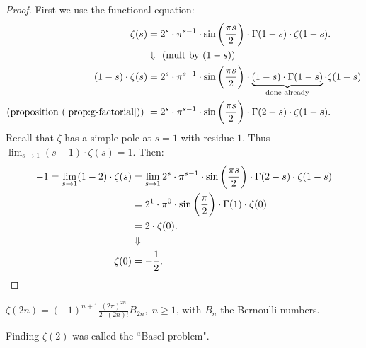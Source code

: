 \begin{proof}
First we use the functional equation:
\begin{align*}
    \zeta(s) &= 2^s \cdot \pi^{s-1} \cdot \sin\left( \frac{\pi s}{2} \right) \cdot \Gamma(1-s) \cdot \zeta(1-s).\\
    &\Downarrow \text{ (mult by $(1-s)$)}\\
    (1-s)\cdot \zeta(s) &= 2^s \cdot \pi^{s-1} \cdot \sin\left( \frac{\pi s}{2} \right) \cdot \underbrace{(1-s)\cdot \Gamma(1-s)}_{\text{done already}} \cdot \zeta(1-s)\\
    \text{(proposition (\ref{prop:g-factorial})) } &= 2^s \cdot \pi^{s-1} \cdot \sin\left( \frac{\pi s}{2} \right) \cdot \Gamma(2-s) \cdot \zeta(1-s).
\end{align*}
Recall that $\zeta$ has a simple pole at $s=1$ with residue $1$. Thus $\lim_{s\to 1} (s-1)\cdot \zeta(s) = 1$. Then:
\begin{align*}
    -1 = \lim_{s\to 1} (1-2)\cdot \zeta(s) &= \lim_{s\to 1} 2^s \cdot \pi^{s-1} \cdot \sin\left( \frac{\pi s}{2} \right) \cdot \Gamma(2-s) \cdot \zeta(1-s)\\
    & = 2^1 \cdot \pi^0 \cdot \sin\left( \frac{\pi}{2} \right) \cdot \Gamma(1) \cdot \zeta(0)\\
    &= 2 \cdot  \zeta(0).\\
    &\Downarrow\\
    \zeta(0) &= - \frac{1}{2}.
\end{align*}
\end{proof}


\begin{corollary}\label{cor:z-even}
$\zeta(2n) =(-1)^{n+1} \frac{(2\pi)^{2n}}{2 \cdot (2n)!} B_{2n}, \; n \geq 1$, with $B_n$ the Bernoulli numbers.
\end{corollary}

\begin{note}
Finding $\zeta(2)$ was called the ``Basel problem".
\end{note}

